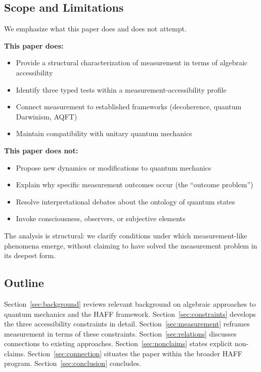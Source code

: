 \documentclass[12pt,a4paper]{article}
\begin{document}
\subsection{Scope and Limitations}

We emphasize what this paper does and does not attempt.

\textbf{This paper does:}
\begin{itemize}
    \item Provide a structural characterization of measurement in terms of algebraic accessibility
    \item Identify three typed tests within a measurement-accessibility profile
    \item Connect measurement to established frameworks (decoherence, quantum Darwinism, AQFT)
    \item Maintain compatibility with unitary quantum mechanics
\end{itemize}

\textbf{This paper does not:}
\begin{itemize}
    \item Propose new dynamics or modifications to quantum mechanics
    \item Explain why specific measurement outcomes occur (the ``outcome problem'')
    \item Resolve interpretational debates about the ontology of quantum states
    \item Invoke consciousness, observers, or subjective elements
\end{itemize}

The analysis is structural: we clarify conditions under which measurement-like phenomena emerge, without claiming to have solved the measurement problem in its deepest form.

\subsection{Outline}

Section~\ref{sec:background} reviews relevant background on algebraic approaches to quantum mechanics and the HAFF framework. Section~\ref{sec:constraints} develops the three accessibility constraints in detail. Section~\ref{sec:measurement} reframes measurement in terms of these constraints. Section~\ref{sec:relations} discusses connections to existing approaches. Section~\ref{sec:nonclaims} states explicit non-claims. Section~\ref{sec:connection} situates the paper within the broader HAFF program. Section~\ref{sec:conclusion} concludes.
\end{document}
